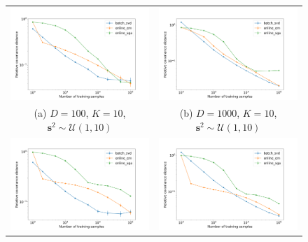 \documentclass[msc,deptreport.inf]{infthesis} %
\newcommand{\matr}[1]{\mathbf{#1}}
\begin{document}
\begin{figure}[!htbp] 
	\begin{tabular}{cc}
		 \includegraphics[width=70mm]{plots/online_fa_covar_distance__observation_dim=100__latent_dim=10__spectrum_min=1__spectrum_max=10.png}
		 & \includegraphics[width=70mm]{plots/online_fa_covar_distance__observation_dim=1000__latent_dim=10__spectrum_min=1__spectrum_max=10.png} \\
		 (a) $D=100$, $K=10$, $\matr{s}^2 \sim \mathcal{U}(1, 10)$ 
		 & (b) $D=1000$, $K=10$, $\matr{s}^2 \sim \mathcal{U}(1, 10)$\\[6pt]
		 \includegraphics[width=70mm]{plots/online_fa_covar_distance__observation_dim=100__latent_dim=10__spectrum_min=1__spectrum_max=100.png}
		 & \includegraphics[width=70mm]{plots/online_fa_covar_distance__observation_dim=1000__latent_dim=10__spectrum_min=1__spectrum_max=100.png} \\

\end{tabular}
\end{figure}
\end{document}
